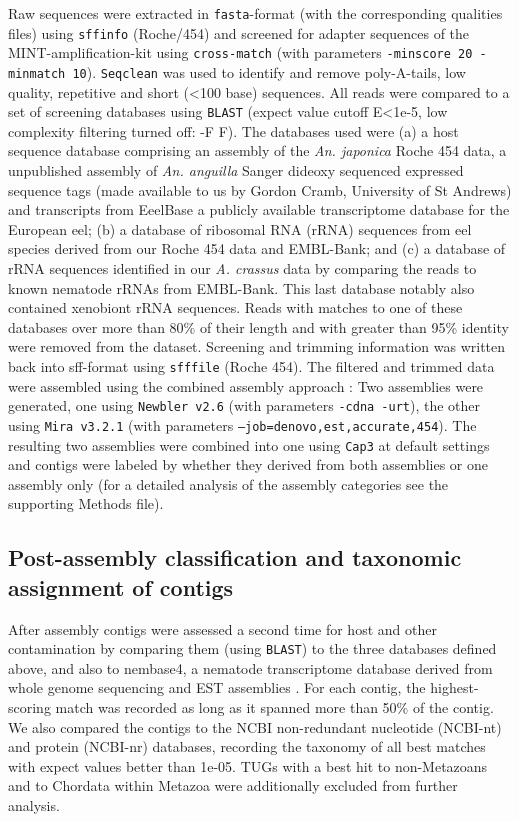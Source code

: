 \documentclass[10pt]{bmc_article}
\newenvironment{bmcformat}{\begin{raggedright}\baselineskip20pt\sloppy\setboolean{publ}{false}}{\end{raggedright}\baselineskip20pt\sloppy}
\begin{document}
\begin{bmcformat}
Raw sequences were extracted in \texttt{fasta}-format (with the
corresponding qualities files) using \texttt{sffinfo} (Roche/454) and
screened for adapter sequences of the MINT-amplification-kit using
\texttt{cross-match} \cite{PHRAP} (with parameters \texttt{-minscore
  20 -minmatch 10}). \texttt{Seqclean} \cite{tgicl_pertea} was used to
identify and remove poly-A-tails, low quality, repetitive and short
(<100 base) sequences. All reads were compared to a set of screening
databases using \texttt{BLAST} (expect value cutoff E<1e-5, low
complexity filtering turned off: -F F). The databases used were (a) a
host sequence database comprising an assembly of the
\textit{An. japonica} Roche 454 data, a unpublished assembly of
\textit{An. anguilla} Sanger dideoxy sequenced expressed sequence tags
(made available to us by Gordon Cramb, University of St Andrews) and
transcripts from EeelBase \cite{pmid21080939} a publicly available
transcriptome database for the European eel; (b) a database of
ribosomal RNA (rRNA) sequences from eel species derived from our Roche
454 data and EMBL-Bank; and (c) a database of rRNA sequences
identified in our \textit{A. crassus} data by comparing the reads to
known nematode rRNAs from EMBL-Bank. This last database notably also
contained xenobiont rRNA sequences. Reads with matches to one of these
databases over more than 80\% of their length and with greater than
95\% identity were removed from the dataset. Screening and trimming
information was written back into sff-format using \texttt{sfffile}
(Roche 454). The filtered and trimmed data were assembled using the
combined assembly approach \cite{pmid20950480}: Two assemblies were
generated, one using \texttt{Newbler v2.6} \cite{pmid16056220} (with
parameters \texttt{-cdna -urt}), the other using \texttt{Mira v3.2.1}
\cite{miraEST} (with parameters
\texttt{--job=denovo,est,accurate,454}). The resulting two assemblies
were combined into one using \texttt{Cap3} \cite{Cap3_Huang} at
default settings and contigs were labeled by whether they derived from
both assemblies or one assembly only (for a detailed analysis of the
assembly categories see the supporting Methods file).

\subsection*{Post-assembly classification and taxonomic assignment of
  contigs}

After assembly contigs were assessed a second time for host and other
contamination by comparing them (using \texttt{BLAST}) to the three
databases defined above, and also to nembase4, a nematode
transcriptome database derived from whole genome sequencing and EST
assemblies \cite{parkinson_nembase:resource_2004, pmid21550347}. For
each contig, the highest-scoring match was recorded as long as it
spanned more than 50\% of the contig. We also compared the contigs to
the NCBI non-redundant nucleotide (NCBI-nt) and protein (NCBI-nr)
databases, recording the taxonomy of all best matches with expect
values better than 1e-05. TUGs with a best hit to non-Metazoans and to
Chordata within Metazoa were additionally excluded from further
analysis.


\end{bmcformat}
\end{document}
